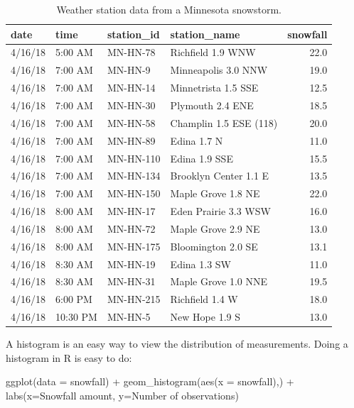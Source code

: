 \documentclass[
]{book}
\newenvironment{Shaded}{\begin{snugshade}}{\end{snugshade}}
\newcommand{\AttributeTok}[1]{\textcolor[rgb]{0.77,0.63,0.00}{#1}}
\newcommand{\FunctionTok}[1]{\textcolor[rgb]{0.00,0.00,0.00}{#1}}
\newcommand{\NormalTok}[1]{#1}
\newcommand{\SpecialCharTok}[1]{\textcolor[rgb]{0.00,0.00,0.00}{#1}}
\newcommand{\StringTok}[1]{\textcolor[rgb]{0.31,0.60,0.02}{#1}}
\theoremstyle{definition}
\theoremstyle{definition}
\theoremstyle{definition}
\theoremstyle{remark}
\begin{document}
\begin{table}

\caption{\label{tab:snow-table}Weather station data from a Minnesota snowstorm.}
\centering
\begin{tabular}[t]{l|l|l|l|r}
\hline
date & time & station\_id & station\_name & snowfall\\
\hline
4/16/18 & 5:00 AM & MN-HN-78 & Richfield 1.9 WNW & 22.0\\
\hline
4/16/18 & 7:00 AM & MN-HN-9 & Minneapolis 3.0 NNW & 19.0\\
\hline
4/16/18 & 7:00 AM & MN-HN-14 & Minnetrista 1.5 SSE & 12.5\\
\hline
4/16/18 & 7:00 AM & MN-HN-30 & Plymouth 2.4 ENE & 18.5\\
\hline
4/16/18 & 7:00 AM & MN-HN-58 & Champlin 1.5 ESE (118) & 20.0\\
\hline
4/16/18 & 7:00 AM & MN-HN-89 & Edina 1.7 N & 11.0\\
\hline
4/16/18 & 7:00 AM & MN-HN-110 & Edina 1.9 SSE & 15.5\\
\hline
4/16/18 & 7:00 AM & MN-HN-134 & Brooklyn Center 1.1 E & 13.5\\
\hline
4/16/18 & 7:00 AM & MN-HN-150 & Maple Grove 1.8 NE & 22.0\\
\hline
4/16/18 & 8:00 AM & MN-HN-17 & Eden Prairie 3.3 WSW & 16.0\\
\hline
4/16/18 & 8:00 AM & MN-HN-72 & Maple Grove 2.9 NE & 13.0\\
\hline
4/16/18 & 8:00 AM & MN-HN-175 & Bloomington 2.0 SE & 13.1\\
\hline
4/16/18 & 8:30 AM & MN-HN-19 & Edina 1.3 SW & 11.0\\
\hline
4/16/18 & 8:30 AM & MN-HN-31 & Maple Grove 1.0 NNE & 19.5\\
\hline
4/16/18 & 6:00 PM & MN-HN-215 & Richfield 1.4 W & 18.0\\
\hline
4/16/18 & 10:30 PM & MN-HN-5 & New Hope 1.9 S & 13.0\\
\hline
\end{tabular}
\end{table}

A histogram is an easy way to view the distribution of measurements. Doing a histogram in R is easy to do:

\begin{Shaded}
\begin{Highlighting}[]
\FunctionTok{ggplot}\NormalTok{(}\AttributeTok{data =}\NormalTok{ snowfall) }\SpecialCharTok{+} 
  \FunctionTok{geom\_histogram}\NormalTok{(}\FunctionTok{aes}\NormalTok{(}\AttributeTok{x =}\NormalTok{ snowfall),) }\SpecialCharTok{+}
  \FunctionTok{labs}\NormalTok{(}\AttributeTok{x=}\StringTok{\textquotesingle{}Snowfall amount\textquotesingle{}}\NormalTok{,}
       \AttributeTok{y=}\StringTok{\textquotesingle{}Number of observations\textquotesingle{}}\NormalTok{)}
\end{Highlighting}
\end{Shaded}
\end{document}
